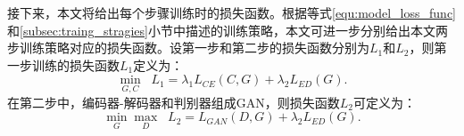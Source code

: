 接下来，本文将给出每个步骤训练时的损失函数。根据等式\ref{equ:model_loss_func}和\ref{subsec:traing_stragies}小节中描述的训练策略，本文可进一步分别给出本文两步训练策略对应的损失函数。设第一步和第二步的损失函数分别为$L_1$和$L_2$，则第一步训练的损失函数$L_1$定义为：
\begin{equation}
\min_{G, C} \;\; L_{1}=\lambda_1 L_{CE}(C,G) + \lambda_2 L_{ED}(G).
\end{equation}
在第二步中，编码器-解码器和判别器组成GAN，则损失函数$L_2$可定义为：
\begin{equation}
\min_{G} \max_D \;\; L_{2}= L_{GAN}(D,G) + \lambda_2 L_{ED}(G).
\end{equation}

